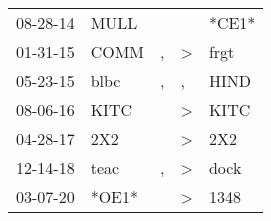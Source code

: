 \begin{supertabular}{p{0.07\textwidth}p{0.06\textwidth}p{0.02\textwidth}p{0.02\textwidth}p{0.06\textwidth}}
          08-28-14\textsuperscript{} &           MULL\textsuperscript{} &                  &                  &                            *CE1* \\
          01-31-15\textsuperscript{} &           COMM\textsuperscript{} &                , &     \textgreater &           frgt\textsuperscript{} \\
          05-23-15\textsuperscript{} &           blbc\textsuperscript{} &                , &                , &           HIND\textsuperscript{} \\
          08-06-16\textsuperscript{} &           KITC\textsuperscript{} &                  &     \textgreater &           KITC\textsuperscript{} \\
          04-28-17\textsuperscript{} &            2X2\textsuperscript{} &                  &     \textgreater &            2X2\textsuperscript{} \\
          12-14-18\textsuperscript{} &           teac\textsuperscript{} &                , &     \textgreater &           dock\textsuperscript{} \\
          03-07-20\textsuperscript{} &                            *OE1* &                  &     \textgreater &           1348\textsuperscript{} \\
\end{supertabular}
